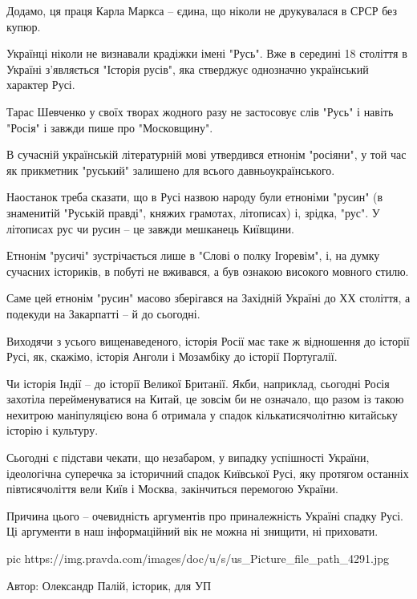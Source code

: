 Додамо, ця праця Карла Маркса – єдина, що ніколи не друкувалася в СРСР без
купюр.

Українці ніколи не визнавали крадіжки імені "Русь". Вже в середині 18 століття
в Україні з'являється "Історія русів", яка стверджує однозначно український
характер Русі.

Тарас Шевченко у своїх творах жодного разу не застосовує слів "Русь" і навіть
"Росія" і завжди пише про "Московщину".

В сучасній українській літературній мові утвердився етнонім "росіяни", у той
час як прикметник "руський" залишено для всього давньоукраїнського.

Наостанок треба сказати, що в Русі назвою народу були етноніми "русин" (в
знаменитій "Руській правді", княжих грамотах, літописах) і, зрідка, "рус". У
літописах рус чи русин – це завжди мешканець Київщини.

Етнонім "русичі" зустрічається лише в "Слові о полку Ігоревім", і, на думку
сучасних істориків, в побуті не вживався, а був ознакою високого мовного стилю.

Саме цей етнонім "русин" масово зберігався на Західній Україні до ХХ століття,
а подекуди на Закарпатті – й до сьогодні.

Виходячи з усього вищенаведеного, історія Росії має таке ж відношення до
історії Русі, як, скажімо, історія Анголи і Мозамбіку до історії Португалії.

Чи історія Індії – до історії Великої Британії. Якби, наприклад, сьогодні Росія
захотіла перейменуватися на Китай, це зовсім би не означало, що разом із такою
нехитрою маніпуляцією вона б отримала у спадок кількатисячолітню китайську
історію і культуру.

Сьогодні є підстави чекати, що незабаром, у випадку успішності України,
ідеологічна суперечка за історичний спадок Київської Русі, яку протягом
останніх півтисячоліття вели Київ і Москва, закінчиться перемогою України.

Причина цього – очевидність аргументів про приналежність Україні спадку Русі.
Ці аргументи в наш інформаційний вік не можна ні знищити, ні приховати.

\ifcmt
pic https://img.pravda.com/images/doc/u/s/us_Picture_file_path_4291.jpg
\fi

Автор: Олександр Палій, історик, для УП
